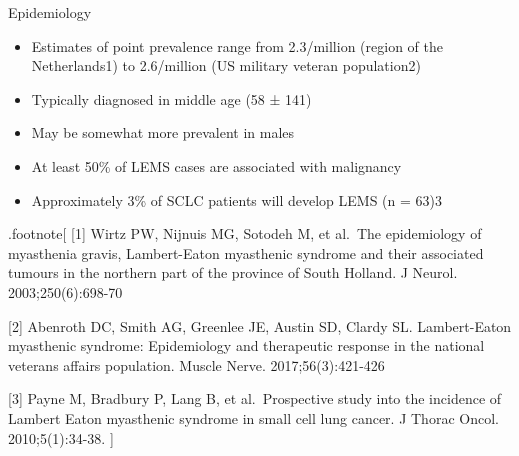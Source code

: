 \documentclass[
  ignorenonframetext,
]{beamer}
\providecommand{\tightlist}{%
  \setlength{\itemsep}{0pt}\setlength{\parskip}{0pt}}
\begin{document}
\begin{frame}{Epidemiology}
\protect\hypertarget{epidemiology}{}
\begin{itemize}
\tightlist
\item
  Estimates of point prevalence range from 2.3/million (region of the
  Netherlands1) to 2.6/million (US military veteran population2)
\item
  Typically diagnosed in middle age (58 ± 141)
\item
  May be somewhat more prevalent in males
\item
  At least 50\% of LEMS cases are associated with malignancy
\item
  Approximately 3\% of SCLC patients will develop LEMS (n = 63)3
\end{itemize}

.footnote{[} {[}1{]} Wirtz PW, Nijnuis MG, Sotodeh M, et al.~The
epidemiology of myasthenia gravis, Lambert-Eaton myasthenic syndrome and
their associated tumours in the northern part of the province of South
Holland. J Neurol. 2003;250(6):698-70

{[}2{]} Abenroth DC, Smith AG, Greenlee JE, Austin SD, Clardy SL.
Lambert-Eaton myasthenic syndrome: Epidemiology and therapeutic response
in the national veterans affairs population. Muscle Nerve.
2017;56(3):421-426

{[}3{]} Payne M, Bradbury P, Lang B, et al.~Prospective study into the
incidence of Lambert Eaton myasthenic syndrome in small cell lung
cancer. J Thorac Oncol. 2010;5(1):34-38. {]}
\end{frame}
\end{document}
